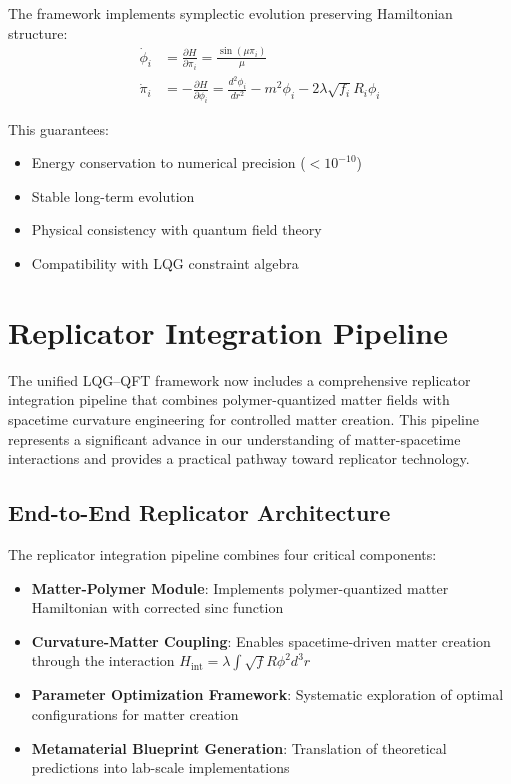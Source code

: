 \documentclass[11pt]{article}
\begin{document}
The framework implements symplectic evolution preserving Hamiltonian structure:
\begin{align}
\dot{\phi}_i &= \frac{\partial H}{\partial \pi_i} = \frac{\sin(\mu\pi_i)}{\mu} \\
\dot{\pi}_i &= -\frac{\partial H}{\partial \phi_i} = \frac{d^2\phi_i}{dr^2} - m^2\phi_i - 2\lambda\sqrt{f_i}R_i\phi_i
\end{align}

This guarantees:
\begin{itemize}
\item Energy conservation to numerical precision ($<10^{-10}$)
\item Stable long-term evolution
\item Physical consistency with quantum field theory
\item Compatibility with LQG constraint algebra
\end{itemize}

\section{Replicator Integration Pipeline}

The unified LQG–QFT framework now includes a comprehensive replicator integration pipeline that combines polymer-quantized matter fields with spacetime curvature engineering for controlled matter creation. This pipeline represents a significant advance in our understanding of matter-spacetime interactions and provides a practical pathway toward replicator technology.

\subsection{End-to-End Replicator Architecture}

The replicator integration pipeline combines four critical components:
\begin{itemize}
\item \textbf{Matter-Polymer Module}: Implements polymer-quantized matter Hamiltonian with corrected sinc function
\item \textbf{Curvature-Matter Coupling}: Enables spacetime-driven matter creation through the interaction $H_{\text{int}} = \lambda \int \sqrt{f} R \phi^2 d^3r$
\item \textbf{Parameter Optimization Framework}: Systematic exploration of optimal configurations for matter creation
\item \textbf{Metamaterial Blueprint Generation}: Translation of theoretical predictions into lab-scale implementations
\end{itemize}
\end{document}
